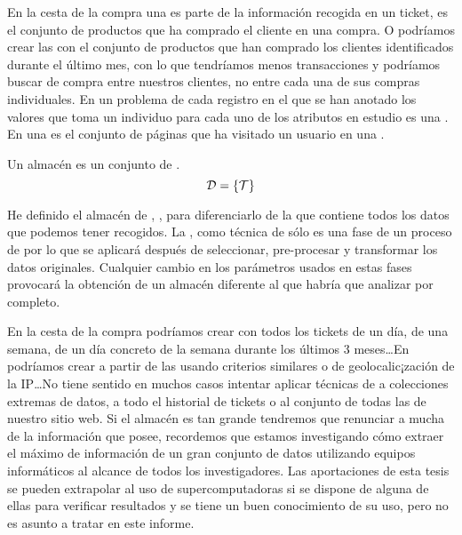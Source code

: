 En la cesta de la compra una \transaccion es parte de la información recogida en un ticket, es el conjunto de productos que ha comprado el cliente en una compra. O podríamos crear las \transacciones con el conjunto de productos que han comprado los clientes identificados durante el último mes, con lo que tendríamos menos transacciones y podríamos buscar \patrones de compra entre nuestros clientes, no entre cada una de sus compras individuales. En un problema de \clasificacion cada registro en el que se han anotado los valores que toma un individuo para cada uno de los atributos en estudio es una \transaccion. En \WUM una \transaccion es el conjunto de páginas que ha visitado un usuario en una \sn.

\begin{Definition}[Almacén \D]
   Un almacén \D es un conjunto de \transacciones.
   \begin{equation}\label{eq:1-3-2-D}
     \D = \left\{\T\right\}
   \end{equation}
\label{def:1:3:2:D}
\end{Definition}

He definido el almacén de \transacciones, \D, para diferenciarlo de la \DB que contiene todos los datos que podemos tener recogidos. La \arm, como técnica de \dm sólo es una fase de un proceso de \KDD por lo que se aplicará después de seleccionar, pre-procesar y transformar los datos originales. Cualquier cambio en los parámetros usados en estas fases provocará la obtención de un almacén \D diferente al que habría que analizar por completo.

En la cesta de la compra podríamos crear \D con todos los tickets de un día, de una semana, de un día concreto de la semana durante los últimos 3 meses\ldots En \WUM podríamos crear \D a partir de las \sns usando criterios similares o de geolocalic¡zación de la IP\ldots No tiene sentido en muchos casos intentar aplicar técnicas de \dm a colecciones extremas de datos, a todo el historial de tickets o al conjunto de todas las \sns de nuestro sitio web. Si el almacén \D es tan grande tendremos que renunciar a mucha de la información que posee, recordemos que estamos investigando cómo extraer el máximo de información de un gran conjunto de datos utilizando equipos informáticos al alcance de todos los investigadores. Las aportaciones de esta tesis se pueden extrapolar al uso de supercomputadoras si se dispone de alguna de ellas para verificar resultados y se tiene un buen conocimiento de su uso, pero no es asunto a tratar en este informe.

